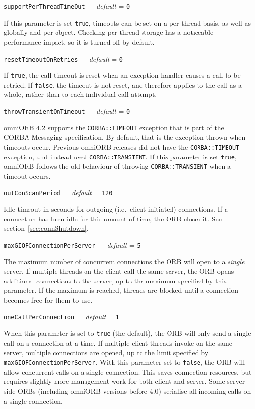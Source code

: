 \documentclass[11pt,oneside,a4paper]{book}
\makeatletter
\newcommand{\code}[1]{\texttt{#1}}
\newcommand{\confopt}[2]
  {\vspace{\baselineskip}\par\noindent\code{#1} ~~ \textit{default} =
   \code{#2}}
\renewcommand{\confopt}[2]
  {\vspace{\baselineskip}\par\noindent\code{#1} ~~ \textit{default} =
   \code{#2}\\[-1ex]\@afterheading}
\newcommand{\dsc}{\discretionary{}{}{}}
\makeatother
\begin{document}
\confopt{supportPerThreadTimeOut}{0}

If this parameter is set \code{true}, timeouts can be set on a per
thread basis, as well as globally and per object. Checking per-thread
storage has a noticeable performance impact, so it is turned off by
default.


\confopt{resetTimeoutOnRetries}{0}

If \code{true}, the call timeout is reset when an exception handler
causes a call to be retried. If \code{false}, the timeout is not
reset, and therefore applies to the call as a whole, rather than to
each individual call attempt.

\confopt{throwTransientOnTimeout}{0}

omniORB 4.2 supports the \code{CORBA::TIMEOUT} exception that is part
of the CORBA Messaging specification. By default, that is the
exception thrown when timeouts occur. Previous omniORB releases did
not have the \code{CORBA::TIMEOUT} exception, and instead used
\code{CORBA::TRANSIENT}. If this parameter is set \code{true}, omniORB
follows the old behaviour of throwing \code{CORBA::TRANSIENT} when a
timeout occurs.


\confopt{outConScanPeriod}{120}

Idle timeout in seconds for outgoing (i.e.\ client initiated)
connections. If a connection has been idle for this amount of time,
the ORB closes it. See section~\ref{sec:connShutdown}.


\confopt{maxGIOPConnectionPerServer}{5}

The maximum number of concurrent connections the ORB will open to a
\emph{single} server. If multiple threads on the client call the same
server, the ORB opens additional connections to the server, up to the
maximum specified by this parameter. If the maximum is reached,
threads are blocked until a connection becomes free for them to use.


\confopt{oneCallPerConnection}{1}

When this parameter is set to \code{true} (the default), the ORB will
only send a single call on a connection at a time. If multiple client
threads invoke on the same server, multiple connections are opened, up
to the limit specified by
\code{maxGIOP\dsc{}ConnectionPerServer}. With this parameter set to
\code{false}, the ORB will allow concurrent calls on a single
connection. This saves connection resources, but requires slightly
more management work for both client and server. Some server-side ORBs
(including omniORB versions before 4.0) serialise all incoming calls
on a single connection.
\end{document}
